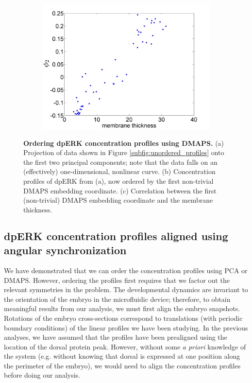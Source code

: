 \documentclass[10pt]{article}
\begin{document}
\begin{figure}[!ht]
\begin{subfigure}{0.3\textwidth}
\includegraphics[width=\textwidth]{DMAPS_time_corr}
\caption{}
\end{subfigure}
\caption{{\bf Ordering dpERK concentration profiles using DMAPS.} (a) Projection of data shown in Figure \ref{subfig:unordered_profiles} onto the first two principal components; note that the data falls on an (effectively) one-dimensional, nonlinear curve. 
(b) Concentration profiles of dpERK from (a), now ordered by the first non-trivial DMAPS embedding coordinate.
(c) Correlation between the first (non-trivial) DMAPS embedding coordinate and the membrane thickness.}
\label{fig:DMAPS_ordering}
\end{figure}

\subsection*{dpERK concentration profiles aligned using angular synchronization}

We have demonstrated that we can order the concentration profiles using PCA or DMAPS.
%
However, ordering the profiles first requires that we factor out the relevant symmetries in the problem.
%
The developmental dynamics are invariant to the orientation of the embryo in the microfluidic device; therefore, to obtain meaningful results from our analysis, we must first align the embryo snapshots.
%
Rotations of the embryo cross-sections correspond to translations (with periodic boundary conditions) of the linear profiles we have been studying.
%
In the previous analyses, we have assumed that the profiles have been prealigned using the location of the dorsal protein peak.
%
However, without some {\em a priori} knowledge of the system (e.g. without knowing that dorsal is expressed at one position along the perimeter of the embryo), we would need to align the concentration profiles before doing our analysis.
\end{document}
